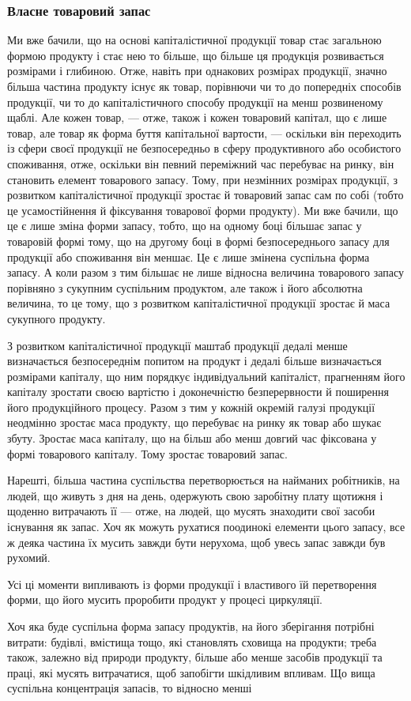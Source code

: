
\subsubsection{Власне товаровий запас}

Ми вже бачили, що на основі капіталістичної продукції товар стає
загальною формою продукту і стає нею то більше, що більше ця продукція
розвивається розмірами і глибиною. Отже, навіть при однакових
розмірах продукції, значно більша частина продукту існує як товар, порівнючи
чи то до попередніх способів продукції, чи то до капіталістичного
способу продукції на менш розвиненому щаблі. Але кожен товар,
— отже, також і кожен товаровий капітал, що є лише товар, але товар
як форма буття капітальної вартости, — оскільки він переходить із
сфери своєї продукції не безпосередньо в сферу продуктивного або
особистого споживання, отже, оскільки він певний переміжний час
перебуває на ринку, він становить елемент товарового запасу. Тому,
при незмінних розмірах продукції, з розвитком капіталістичної продукції
зростає й товаровий запас сам по собі (тобто це усамостійнення й фіксування
товарової форми продукту). Ми вже бачили, що це є лише зміна
форми запасу, тобто, що на одному боці більшає запас у товаровій
формі тому, що на другому боці в формі безпосереднього запасу для
продукції або споживання він меншає. Це є лише змінена суспільна
форма запасу. А коли разом з тим більшає не лише відносна величина
товарового запасу порівняно з сукупним суспільним продуктом, але також
і його абсолютна величина, то це тому, що з розвитком капіталістичної
продукції зростає й маса сукупного продукту.

З розвитком капіталістичної продукції маштаб продукції дедалі менше
визначається безпосереднім попитом на продукт і дедалі більше визначається
розмірами капіталу, що ним порядкує індивідуальний капіталіст,
прагненням його капіталу зростати своєю вартістю і доконечністю безперервности
й поширення його продукційного процесу. Разом з тим у
кожній окремій галузі продукції неодмінно зростає маса продукту, що
перебуває на ринку як товар або шукає збуту. Зростає маса капіталу, що
на більш або менш довгий час фіксована у формі товарового капіталу.
Тому зростає товаровий запас.

Нарешті, більша частина суспільства перетворюється на найманих
робітників, на людей, що живуть з дня на день, одержують свою заробітну
плату щотижня і щоденно витрачають її — отже, на людей, що
мусять знаходити свої засоби існування як запас. Хоч як можуть рухатися
поодинокі елементи цього запасу, все ж деяка частина їх мусить
завжди бути нерухома, щоб увесь запас завжди був рухомий.

Усі ці моменти випливають із форми продукції і властивого їй
перетворення форми, що його мусить проробити продукт у процесі
циркуляції.

Хоч яка буде суспільна форма запасу продуктів, на його зберігання потрібні
витрати: будівлі, вмістища тощо, які становлять сховища на продукти;
треба також, залежно від природи продукту, більше або менше засобів продукції
та праці, які мусять витрачатися, щоб запобігти шкідливим
впливам. Що вища суспільна концентрація запасів, то відносно менші
\parbreak{}  %
